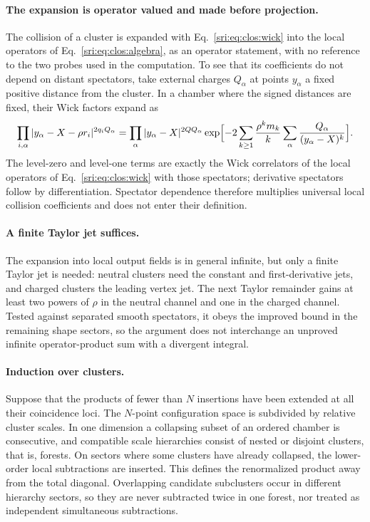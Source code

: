 \paragraph{The expansion is operator valued and made before projection.} The collision of a cluster is expanded with
Eq.~\eqref{sri:eq:clos:wick} into the local operators of Eq.~\eqref{sri:eq:clos:algebra}, as an operator statement, with no
reference to the two probes used in the computation. To see that its coefficients do not depend on distant spectators,
take external charges $Q_\alpha$ at points $y_\alpha$ a fixed positive distance from the cluster. In a chamber where the
signed distances are fixed, their Wick factors expand as
\begin{equation}
 \prod_{i,\alpha}|y_\alpha-X-\rho r_i|^{2q_iQ_\alpha}
 =\prod_\alpha|y_\alpha-X|^{2QQ_\alpha}
 \exp\Bigl[-2\sum_{k\ge1}\frac{\rho^km_k}{k}\sum_\alpha\frac{Q_\alpha}{(y_\alpha-X)^k}\Bigr].
 \label{sri:eq:clos:spectator}
\end{equation}
The level-zero and level-one terms are exactly the Wick correlators of the local operators of
Eq.~\eqref{sri:eq:clos:wick} with those spectators; derivative spectators follow by differentiation. Spectator dependence
therefore multiplies universal local collision coefficients and does not enter their definition.

\paragraph{A finite Taylor jet suffices.} The expansion into local output fields is in general infinite, but only a
finite Taylor jet is needed: neutral clusters need the constant and first-derivative jets, and charged clusters the
leading vertex jet. The next Taylor remainder gains at least two powers of $\rho$ in the neutral channel and one in the
charged channel. Tested against separated smooth spectators, it obeys the improved bound in the remaining shape
sectors, so the argument does not interchange an unproved infinite operator-product sum with a divergent integral.

\paragraph{Induction over clusters.} Suppose that the products of fewer than $N$ insertions have been extended at all
their coincidence loci. The $N$-point configuration space is subdivided by relative cluster scales. In one dimension a
collapsing subset of an ordered chamber is consecutive, and compatible scale hierarchies consist of nested or disjoint
clusters, that is, forests. On sectors where some clusters have already collapsed, the lower-order local subtractions
are inserted. This defines the renormalized product away from the total diagonal. Overlapping candidate subclusters
occur in different hierarchy sectors, so they are never subtracted twice in one forest, nor treated as independent
simultaneous subtractions.

